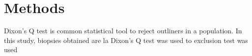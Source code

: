 \chapter{Methods}

Dixon's Q test is common statistical tool to reject outliners in a population. In this study, biopsies obtained are la Dixon's Q test was used to   exclusion test was used 